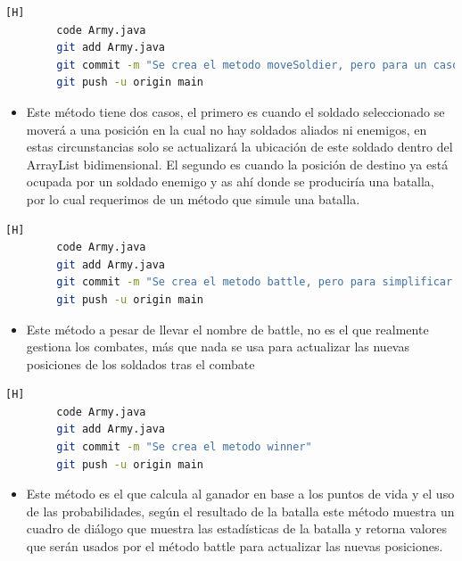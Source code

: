 \documentclass{article}
\begin{document}
	\begin{lstlisting}[language=bash,caption={Commit: d22eb15ed7ad2ea792ee5f1c28bfe93268a154d3 }][H]
		code Army.java
		git add Army.java
		git commit -m "Se crea el metodo moveSoldier, pero para un caso se necesita usar un metodo que simule una batalla"			
		git push -u origin main
	\end{lstlisting}
	
	
	\begin{itemize}
		\item Este método tiene dos casos, el primero es cuando el soldado seleccionado se moverá a una posición en la cual no hay soldados aliados ni enemigos, en estas circunstancias solo se actualizará la ubicación de este soldado dentro del ArrayList bidimensional. El segundo es cuando la posición de destino ya está ocupada por un soldado enemigo y as ahí donde se produciría una batalla, por lo cual requerimos de un método que simule una batalla.
	\end{itemize}
	
	
	
	\begin{lstlisting}[language=bash,caption={Commit: 5c8804ab36be558c9b6c7450436559b8da1fe8da }][H]
		code Army.java
		git add Army.java
		git commit -m "Se crea el metodo battle, pero para simplificar el metodo, se requiere uno que determine al ganador"			
		git push -u origin main
	\end{lstlisting}
	
	
	\begin{itemize}
		\item Este método a pesar de llevar el nombre de battle, no es el que realmente gestiona los combates, más que nada se usa para actualizar las nuevas posiciones de los soldados tras el combate
	\end{itemize}


	\begin{lstlisting}[language=bash,caption={Commit: 2b03d7c1ed558e54ee31c51f78d89cfa4864b212 }][H]
		code Army.java
		git add Army.java
		git commit -m "Se crea el metodo winner"			
		git push -u origin main
	\end{lstlisting}
	
	
	\begin{itemize}
		\item Este método es el que calcula al ganador en base a los puntos de vida y el uso de las probabilidades, según el resultado de la batalla este método muestra un cuadro de diálogo que muestra  las estadísticas de la batalla y retorna valores que serán usados por el método battle para actualizar las nuevas posiciones.
	\end{itemize}
	
\end{document}
